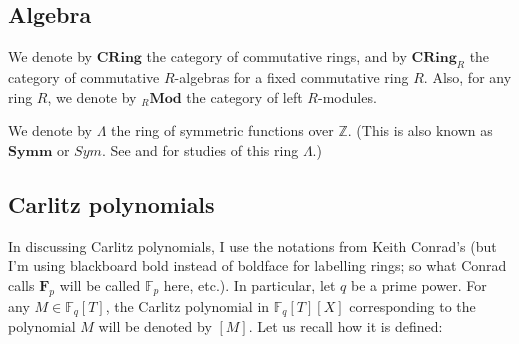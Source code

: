 \documentclass[numbers=enddot,12pt,final,onecolumn,notitlepage]{scrartcl}%
\theoremstyle{definition}
\begin{document}
\subsection{Algebra}

We denote by $\mathbf{CRing}$ the category of commutative rings, and by
$\mathbf{CRing}_{R}$ the category of commutative $R$-algebras for a fixed
commutative ring $R$. Also, for any ring $R$, we denote by $_{R}\mathbf{Mod}$
the category of left $R$-modules.

We denote by $\Lambda$ the ring of symmetric functions over $\mathbb{Z}$.
(This is also known as $\mathbf{Symm}$ or $Sym$. See \cite[\S 2]{reiner-hopf}
and \cite[Chapter 7]{stanley-ec2} for studies of this ring $\Lambda$.)

\subsection{Carlitz polynomials}

In discussing Carlitz polynomials, I use the notations from Keith Conrad's
\cite{kc-carlitz} (but I'm using blackboard bold instead of boldface for
labelling rings; so what Conrad calls $\mathbf{F}_{p}$ will be called
$\mathbb{F}_{p}$ here, etc.). In particular, let $q$ be a prime power. For any
$M\in\mathbb{F}_{q}\left[  T\right]  $, the Carlitz polynomial in
$\mathbb{F}_{q}\left[  T\right]  \left[  X\right]  $ corresponding to the
polynomial $M$ will be denoted by $\left[  M\right]  $. Let us recall how it
is defined:
\end{document}
